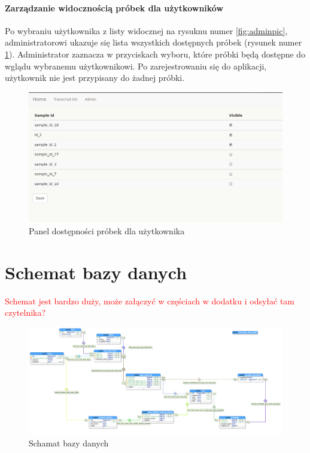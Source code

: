\documentclass[a4paper,12pt,twoside]{article}
\begin{document}
\newpage
\paragraph{Zarządzanie widocznością próbek dla użytkowników}
Po wybraniu użytkownika z listy widocznej na rysuknu numer \ref{fig:adminpic}, 
administratorowi ukazuje się lista wszystkich dostępnych próbek (rysunek numer \ref{fig:user_priviligespic}). Administrator zaznacza w przyciskach wyboru, które próbki będą dostępne 
do wglądu wybranemu użytkownikowi. Po zarejestrowaniu się do aplikacji, użytkownik nie jest przypisany do żadnej próbki. 
 
\begin{figure}[h]
  \centering
  \includegraphics[width=\textwidth]{obrazy/aplikacja/user_priviliges.png}
  \caption{Panel dostępności próbek dla użytkownika}
  \label{fig:user_priviligespic}
\end{figure}

\newpage
\section{Schemat bazy danych}
\textcolor{red}{
Schemat jest bardzo duży, może załączyć w częściach w dodatku i odsyłać tam czytelnika?
}
\begin{figure}
  \includegraphics[width=\linewidth]{obrazy/database.png}
  \caption{Schamat bazy danych}
  \label{fig:bazadanych}
\end{figure}
\end{document}
